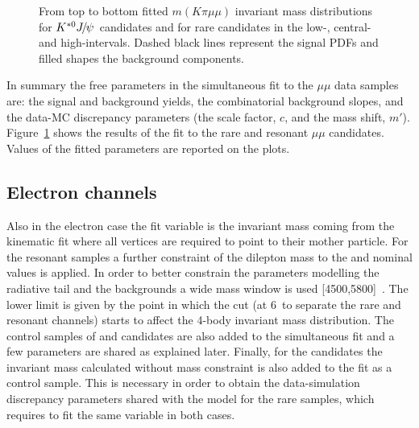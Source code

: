 \begin{figure}[h!]
\caption{From top to bottom fitted $m(K\pi \mu\mu)$ invariant mass distributions
 for $\Kstarz\jpsi$ candidates and for rare candidates in the low-, central- and high-\qsq intervals.
Dashed black lines represent the signal PDFs and filled shapes the background components. }
\label{fig:mumu_data_fits}
\end{figure}

In summary the free parameters in the simultaneous fit to the $\mu\mu$ data samples are:
the signal and background yields, the combinatorial background slopes, and the data-MC
discrepancy parameters (the scale factor, $c$, and the mass shift, $m'$).
%
Figure~\ref{fig:mumu_data_fits} shows the results of the fit to the rare and resonant
$\mu\mu$ candidates. Values of the fitted parameters are reported on the plots.

\clearpage

\subsection{Electron channels}
\label{sec:RKst_fit_ee}

Also in the electron case the fit variable is the \mKpiee invariant mass coming from the kinematic
fit where all vertices are required to point to their mother particle. 
For the resonant samples a further constraint of the dilepton mass to the \jpsi and \psitwos nominal values is applied.
%
In order to better constrain the parameters modelling the radiative tail and the
backgrounds a wide mass window is used [4500,5800]~\mevcc. The lower limit is given
by the point in which the \qsq cut (at 6~\gevgevcccc to separate the rare and resonant channels)
starts to affect the 4-body invariant mass distribution. The control samples of \BdToKstPsiee and
\BdToKstGee candidates are also added to the simultaneous fit and a few parameters are shared as explained later.
Finally, for the \BdToKstJPsee candidates the invariant mass calculated without \jpsi mass constraint
is also added to the fit as a control sample. This is necessary in order to obtain the data-simulation discrepancy parameters
shared with the model for the rare samples, which requires to fit the same variable in both cases.

